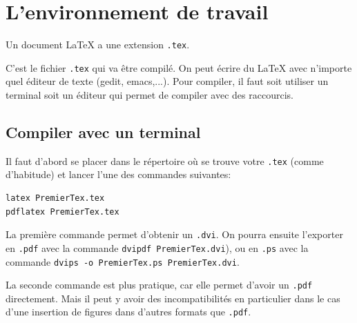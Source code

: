 \documentclass[a4paper,11pt]{article}
\begin{document}
\section{L'environnement de travail}   

Un document \LaTeX{} a une extension \texttt{.tex}. 


C'est le fichier \texttt{.tex} qui va être compilé. 
On peut écrire du \LaTeX{} avec n'importe quel éditeur de texte (gedit, emacs,...). 
Pour compiler, il faut soit utiliser un terminal soit un éditeur qui  permet de compiler avec des raccourcis.

\subsection{Compiler avec un terminal}

Il faut d'abord se placer dans le répertoire où se trouve votre \texttt{.tex}  (comme d'habitude)  et lancer l'une des commandes suivantes:

\begin{verbatim}
latex PremierTex.tex
pdflatex PremierTex.tex
\end{verbatim}


La première commande permet d'obtenir un \texttt{.dvi}. 
On pourra ensuite l'exporter en \texttt{.pdf}  avec la  commande \texttt{dvipdf PremierTex.dvi}), 
ou en \texttt{.ps} avec la commande \texttt{dvips -o PremierTex.ps PremierTex.dvi}.

La seconde commande est plus pratique, car elle permet d'avoir un \texttt{.pdf} directement.
Mais il peut y avoir des incompatibilités en particulier dans le cas d'une insertion de figures dans d'autres formats que \texttt{.pdf}.
\end{document}
